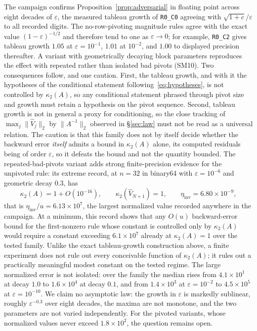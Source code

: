 \documentclass[review,onefignum,onetabnum]{siamart251216}
\begin{document}
The campaign confirms Proposition~\ref{prop:adversarial} in floating point across eight decades of
$\varepsilon$, the measured tableau growth of \texttt{R0\_C0} agreeing with
$\sqrt{1+c}/\varepsilon$ to all recorded digits. The no-row-pivoting magnitude rules agree with the exact value $(1-\varepsilon)^{-1/2}$ and therefore
tend to one as $\varepsilon\to0$; for example, \texttt{R0\_C2} gives tableau growth $1.05$
at $\varepsilon=10^{-1}$, $1.01$ at $10^{-2}$, and $1.00$ to displayed precision thereafter.
A variant with geometrically decaying block parameters reproduces the effect with repeated rather
than isolated bad pivots (SM10). Two consequences follow, and one caution. First, the tableau growth, and with
it the hypotheses of the conditional statement following~\eqref{eq:hypotheses}, is not controlled by $\kappa_2(A)$, so any
conditional statement phrased through pivot size and growth must retain a hypothesis on the pivot
sequence. Second, tableau growth is not in general a proxy for conditioning, so the close
tracking of $\max_j\|\widehat V_j\|_2$ by $\|A^{-1}\|_2$ observed in \S\ref{sec:law} must not be
read as a universal relation. The caution is that this family does not by itself decide whether
the backward error \emph{itself} admits a bound in $\kappa_2(A)$ alone, its computed residuals
being of order $\varepsilon$, so it defeats the bound and not the quantity bounded. The
repeated-bad-pivots variant adds strong finite-precision evidence for the unpivoted rule: its extreme record, at
$n=32$ in binary64 with $\varepsilon=10^{-6}$ and geometric decay $0.3$, has
%
\begin{equation}\label{eq:counterexample}
\kappa_2(A) = 1 + O(10^{-16}),
\qquad
\kappa_2(\widehat V_{N+1}) = 1,
\qquad
\eta_{\mathrm{inv}} = 6.80\times10^{-9},
\end{equation}
%
that is $\eta_{\mathrm{inv}}/u = 6.13\times10^{7}$, the largest normalized value recorded
anywhere in the campaign. At a minimum, this record shows that any $O(u)$ backward-error bound for the first-nonzero
rule whose constant is controlled only by $\kappa_2(A)$ would require a constant exceeding
$6.1\times10^7$ already at $\kappa_2(A)=1$ over the tested family. Unlike the exact tableau-growth
construction above, a finite experiment does not rule out every conceivable function of
$\kappa_2(A)$; it rules out a practically meaningful modest constant on the tested regime. The
large normalized error is not isolated: over the family the median rises from $4.1\times10^{1}$ at decay
$1.0$ to $1.6\times10^{4}$ at decay $0.1$, and from $1.4\times10^{3}$ at $\varepsilon=10^{-2}$ to
$4.5\times10^{5}$ at $\varepsilon=10^{-10}$. We claim no asymptotic law: the growth in
$\varepsilon$ is markedly sublinear, roughly $\varepsilon^{-0.3}$ over eight decades, the maxima
are not monotone, and the two parameters are not varied independently. For the pivoted variants,
whose normalized values never exceed $1.8\times10^{2}$, the question remains open.
\end{document}
